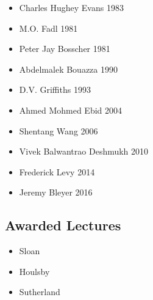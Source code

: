 \documentclass[a4paper, nobind]{templates/ociamthesis}
\providecommand{\tightlist}{%
  \setlength{\itemsep}{0pt}\setlength{\parskip}{0pt}}
\newcommand*{\bibtitle}{Works Cited}
\begin{document}
\begin{itemize}
\tightlist
\item
  Charles Hughey Evans 1983
\item
  M.O. Fadl 1981
\item
  Peter Jay Bosscher 1981
\item
  Abdelmalek Bouazza 1990
\item
  D.V. Griffiths 1993
\item
  Ahmed Mohmed Ebid 2004
\item
  Shentang Wang 2006
\item
  Vivek Balwantrao Deshmukh 2010
\item
  Frederick Levy 2014
\item
  Jeremy Bleyer 2016
\end{itemize}

\hypertarget{awarded-lectures}{%
\subsection{Awarded Lectures}\label{awarded-lectures}}

\begin{itemize}
\tightlist
\item
  Sloan
\item
  Houlsby
\item
  Sutherland
\end{itemize}


\setlength{\baselineskip}{0pt} %

{\renewcommand*\MakeUppercase[1]{#1}%
\printbibliography[heading=bibintoc,title={\bibtitle}]}
\end{document}
